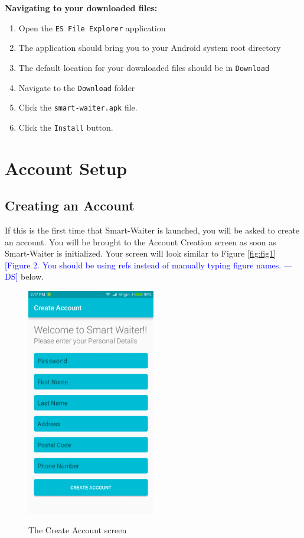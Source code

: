 \documentclass[12pt, titlepage]{article}
\newcommand{\authornote}[3]{\textcolor{#1}{[#3 ---#2]}}
\newcommand{\authornote}[3]{}
\newcommand{\ds}[1]{\authornote{blue}{DS}{#1}}
\begin{document}
\textbf{\newline Navigating to your downloaded files:}
	\begin{enumerate}
		\item Open the \texttt{ES File Explorer} application
		\item The application should bring you to your Android system root directory
		\item The default location for your downloaded files should be in \texttt{Download}
		\item Navigate to the \texttt{Download} folder
		\item Click the \texttt{smart-waiter.apk} file.
		\item Click the \texttt{Install} button.
	\end{enumerate}	


\section{Account Setup}
\subsection{Creating an Account}
If this is the first time that Smart-Waiter is launched, you will be asked to create an account. You will be brought to the Account Creation screen as soon as Smart-Waiter is initialized. Your screen will look similar to Figure \ref{fig:fig1} 
\ds{Figure 2. You should be using refs instead of manually typing figure names.}
below. 

\begin{center}
	\begin{figure}
	\includegraphics[width=0.5\textwidth]{accountCreation.PNG} 
	\label{fig:fig2}
	\linebreak \caption{The Create Account screen}
	\end{figure}
\end{center}
\end{document}
